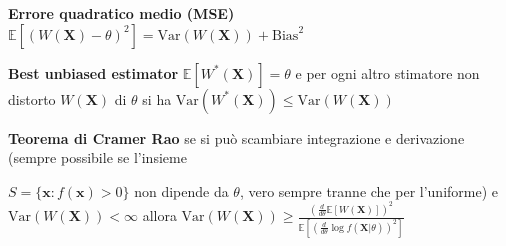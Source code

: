 \documentclass[openany]{book} %
\begin{document}
\textbf{Errore quadratico medio (MSE)} $\mathbb{E}[(W(\boldsymbol{X})-\theta)^2]=\text{Var}(W(\boldsymbol{X}))+\text{Bias}^2$

\textbf{Best unbiased estimator} $\mathbb{E}[W^*(\boldsymbol{X})]=\theta$ e per ogni altro stimatore non distorto $W(\boldsymbol{X})$ di $\theta$ si ha $\text{Var}(W^*(\boldsymbol{X}))\leq \text{Var}(W(\boldsymbol{X}))$

\pagebreak

\textbf{Teorema di Cramer Rao} se si può scambiare integrazione e derivazione (sempre possibile se l'insieme 

$S=\{\boldsymbol{x}:f(\boldsymbol{x})>0\}$ non dipende da $\theta$, vero sempre tranne che per l'uniforme) e $\text{Var}(W(\boldsymbol{X}))<\infty$ allora $\text{Var}(W(\boldsymbol{X}))\geq \frac{(\frac{d}{d\theta}\mathbb{E}[W(\boldsymbol{X})])^2}{\mathbb{E}[(\frac{d}{d\theta}\log f(\boldsymbol{X}|\theta))^2]}$
\end{document}
